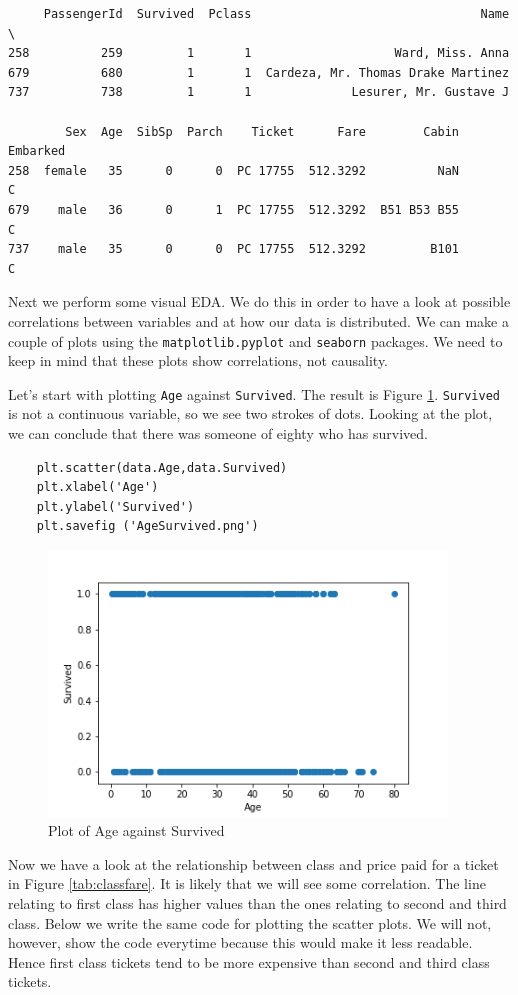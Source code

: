\documentclass[11pt]{article}
\begin{document}
\begin{verbatim}
     PassengerId  Survived  Pclass                                Name  \
258          259         1       1                    Ward, Miss. Anna   
679          680         1       1  Cardeza, Mr. Thomas Drake Martinez   
737          738         1       1              Lesurer, Mr. Gustave J   

        Sex  Age  SibSp  Parch    Ticket      Fare        Cabin Embarked  
258  female   35      0      0  PC 17755  512.3292          NaN        C  
679    male   36      0      1  PC 17755  512.3292  B51 B53 B55        C  
737    male   35      0      0  PC 17755  512.3292         B101        C  
\end{verbatim}


Next we perform some visual EDA. We do this in order to have a look at possible correlations between variables and at how our data is distributed. We can make a couple of plots using the \texttt{matplotlib.pyplot} and \texttt{seaborn} packages. We need to keep in mind that these plots show correlations, not causality.  

Let's start with plotting \texttt{Age} against \texttt{Survived}. The result is Figure \ref{tab:agesurvived}. \texttt{Survived} is not a continuous variable, so we see two strokes of dots. Looking at the plot, we can conclude that there was someone of eighty who has survived. 
\begin{verbatim}
    plt.scatter(data.Age,data.Survived)
    plt.xlabel('Age')
    plt.ylabel('Survived')
    plt.savefig ('AgeSurvived.png')
\end{verbatim}

\begin{figure}[htbp]
\centering
\includegraphics[width=400px]{./AgeSurvived.png}
\caption{\label{tab:agesurvived}
Plot of Age against Survived}
\end{figure}
Now we have a look at the relationship between class and price paid for a ticket in Figure \ref{tab:classfare}. It is likely that we will see some correlation. The line relating to first class has higher values than the ones relating to second and third class. Below we write the same code for plotting the scatter plots. We will not, however, show the code everytime because this would make it less readable. Hence first class tickets tend to be more expensive than second and third class tickets. 
\end{document}

